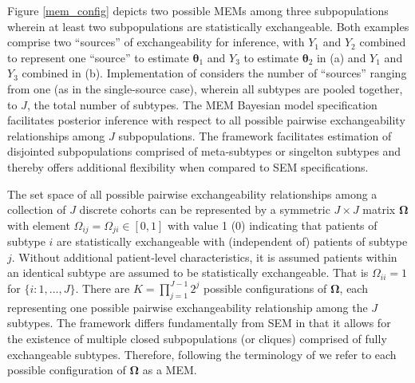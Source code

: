 Figure \ref{mem_config} depicts two possible MEMs among three subpopulations wherein at least two subpopulations are statistically exchangeable. Both examples comprise two ``sources'' of exchangeability for inference, with $Y_1$ and $Y_2$ combined to represent one ``source'' to estimate ${\bm\theta_1}$ and $Y_3$ to estimate ${\bm\theta_2}$ in (a) and $Y_1$ and $Y_3$ combined in (b). Implementation of  considers the number of ``sources'' ranging from one (as in the single-source case), wherein all subtypes are pooled together, to $J$, the total number of subtypes. The MEM Bayesian model specification facilitates posterior inference with respect to all possible pairwise exchangeability relationships among $J$ subpopulations. The framework facilitates estimation of disjointed subpopulations comprised of meta-subtypes or singelton subtypes and thereby offers additional flexibility when compared to SEM specifications.

%
The set space of all possible pairwise exchangeability relationships among a collection of $J$ discrete cohorts can be represented by a symmetric $J \times J$ matrix $\bm{\Omega}$ with element $\Omega_{ij} = \Omega_{ji} \in [0, 1]$ with value 1 (0) indicating that patients of subtype $i$ are statistically exchangeable with (independent of) patients of subtype $j$. Without additional patient‐level characteristics, it is assumed patients within an identical subtype are assumed to be statistically exchangeable. That is $\Omega_{ii} = 1$ for $\{i : 1, ..., J\}$. There are $K = \prod_{j=1}^{J-1} 2^j$ possible configurations of $\bm{\Omega}$, each representing one possible pairwise exchangeability relationship among the $J$ subtypes. The framework differs fundamentally from SEM in that it allows for the existence of multiple closed subpopulations (or cliques) comprised of fully exchangeable subtypes. Therefore, following the terminology of \cite{kaizer2017} we refer to each possible configuration of $\bm{\Omega}$ as a MEM. 

